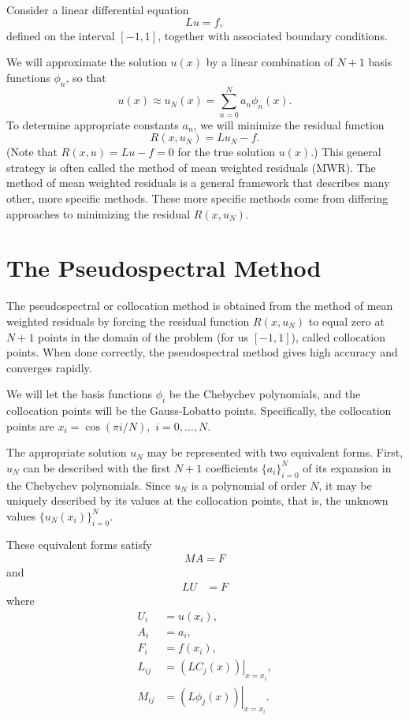 \label{lab:pseudospectral1_revision}

Consider a linear differential equation 
\[Lu = f, \]
defined on the interval $[-1,1]$, together with associated boundary conditions. 

We will approximate the solution $u(x)$ by a linear combination of $N+1$ basis functions $\phi_n$, so that 
\[
u(x) \approx u_N(x) = \sum_{n=0}^N a_n \phi_n(x). 
\]
To determine appropriate constants $a_n$, we will minimize the residual function 
\[
R(x,u_N) = Lu_N - f.
\]
(Note that $R(x,u) = Lu - f = 0$ for the true solution $u(x)$.) 
This general strategy is often called the method of mean weighted residuals (MWR). The method of mean weighted residuals is a general framework that describes many other, more specific methods. These more specific methods come from differing approaches to minimizing the residual $R(x,u_N)$.


\section*{The Pseudospectral Method}
The pseudospectral or collocation method is obtained from the method of mean weighted residuals by forcing the residual function $R(x,u_N)$ to equal zero at $N+1$ points in the domain of the problem (for us $[-1,1]$), called collocation points. 
When done correctly, the pseudospectral method gives high accuracy and converges rapidly. 

We will let the basis functions $\phi_i$ be the Chebychev polynomials, and the collocation points will be the Gauss-Lobatto points. 
Specifically, the collocation points are $x_i = \cos(\pi i /N),$ $ i = 0, \ldots, N$.


The appropriate solution $u_N$ may be represented with two equivalent forms. 
First, $u_N$ can be described with the first $N+1$ coefficients  $\{a_i\}_{i=0}^N$ of its expansion in the Chebychev polynomials. 
Since $u_N$ is a polynomial of order $N$, it may be uniquely described by its values at the collocation points, that is, the unknown values  $\{u_N(x_i)\}_{i=0}^N$.

These equivalent forms satisfy
\begin{align}
	MA = F \label{spectral1b:chebychev_expansion}
\end{align}
and
\begin{align}
	LU &= F \label{spectral1b:grid_point}
\end{align}
where 
\begin{align*}
	U_i &= u(x_i),\\
	A_i &= a_i,\\
	F_i &= f(x_i),\\
	L_{ij} &= \left.(LC_j(x))\right|_{x=x_i},\\
	M_{ij} &= \left.(L\phi_j(x))\right|_{x=x_i}. 
\end{align*}

